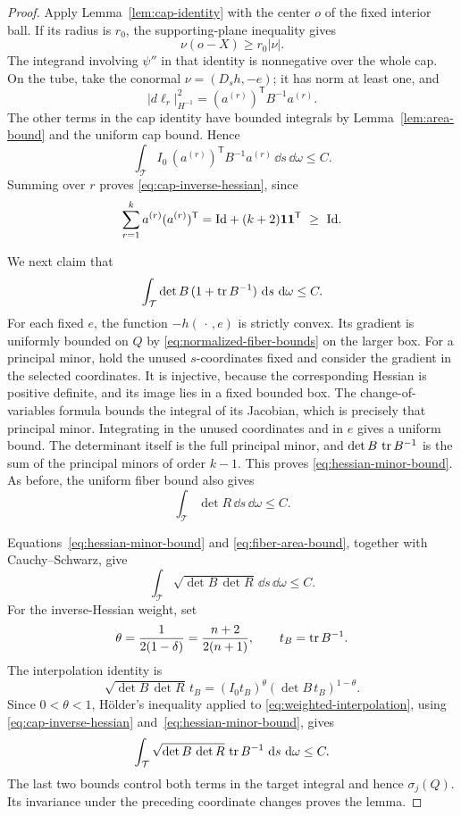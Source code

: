 \begin{proof}
Apply Lemma~\ref{lem:cap-identity} with the center \(o\) of the fixed
interior ball.  If its radius is \(r_0\), the supporting-plane inequality
gives
\[
 \nu(o-X)\ge r_0|\nu|.
\]
The integrand involving \(\psi''\) in that identity is nonnegative over
the whole cap.  On the tube, take the conormal
\(\nu=(D_sh,-e)\); it has norm at least one, and
\[
 |d\ell_r|_{H^{-1}}^2=(a^{(r)})^{\mathsf T}B^{-1}a^{(r)}.
\]
The other terms in the cap identity have bounded integrals by
Lemma~\ref{lem:area-bound} and the uniform cap bound.  Hence
\[
 \int_{\mathcal T} I_0\,
       (a^{(r)})^{\mathsf T}B^{-1}a^{(r)}
       \,\dd s\,\dd\omega\le C.
\]
Summing over \(r\) proves \eqref{eq:cap-inverse-hessian}, since
\[
 \sum_{r=1}^k a^{(r)}(a^{(r)})^{\mathsf T}
       =\mathrm{Id}+(k+2)\mathbf1\mathbf1^{\mathsf T}\ \ge\ \mathrm{Id}.
\]

We next claim that
\begin{equation}\label{eq:hessian-minor-bound}
 \int_{\mathcal T}\det B\,(1+\operatorname{tr} B^{-1})\,\mathop{}\!\mathrm d s\,\mathop{}\!\mathrm d\omega\le C.
\end{equation}
For each fixed \(e\), the function \(-h(\,\cdot\,,e)\) is strictly convex.
Its gradient is uniformly bounded on \(Q\) by
\eqref{eq:normalized-fiber-bounds} on the larger box.
For a principal minor, hold the unused \(s\)-coordinates fixed and
consider the gradient in the selected coordinates.  It is injective,
because the corresponding Hessian is positive definite, and its image
lies in a fixed bounded box.  The change-of-variables formula bounds the
integral of its Jacobian, which is precisely that principal minor.
Integrating in the unused coordinates and in \(e\) gives a uniform bound.
The determinant itself is the full principal minor, and
\(\det B\,\operatorname{tr} B^{-1}\) is the sum of the principal minors of order \(k-1\).
This proves \eqref{eq:hessian-minor-bound}.
As before, the uniform fiber bound also gives
\begin{equation}\label{eq:fiber-area-bound}
 \int_{\mathcal T}\det R\,\dd s\,\dd\omega\le C.
\end{equation}

Equations~\eqref{eq:hessian-minor-bound} and
\eqref{eq:fiber-area-bound}, together with Cauchy--Schwarz, give
\[
 \int_{\mathcal T}\sqrt{\det B\,\det R}
       \,\dd s\,\dd\omega\le C.
\]
For the inverse-Hessian weight, set
\[
 \theta=\frac1{2(1-\delta)}=\frac{n+2}{2(n+1)},
 \qquad t_B=\operatorname{tr} B^{-1}.
\]
The interpolation identity is
\begin{equation}\label{eq:weighted-interpolation}
 \sqrt{\det B\,\det R}\,t_B
       =(I_0t_B)^\theta(\det B\,t_B)^{1-\theta}.
\end{equation}
Since \(0<\theta<1\), H\"older's inequality applied to
\eqref{eq:weighted-interpolation}, using
\eqref{eq:cap-inverse-hessian} and~\eqref{eq:hessian-minor-bound},
gives
\[
 \int_{\mathcal T}\sqrt{\det B\,\det R}\,
           \operatorname{tr} B^{-1}\,\mathop{}\!\mathrm d s\,\mathop{}\!\mathrm d\omega\le C.
\]
The last two bounds control both terms in the target integral and hence
\(\sigma_j(Q)\).
Its invariance under the preceding coordinate changes proves the lemma.
\end{proof}

